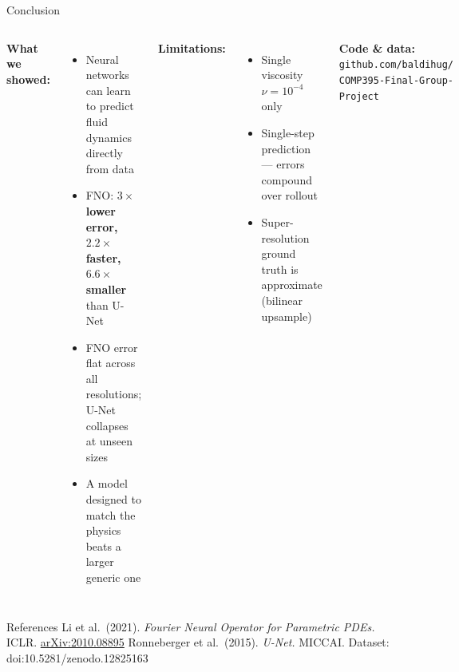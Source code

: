 \documentclass[aspectratio=169, 11pt]{beamer}
\begin{document}
\begin{frame}{Conclusion}
  \begin{columns}[t]
      \textbf{What we showed:}
      \begin{itemize}
        \item Neural networks can learn to predict fluid dynamics directly from data
        \item FNO: \textbf{$3\times$ lower error, $2.2\times$ faster, $6.6\times$ smaller} than U-Net
        \item FNO error flat across all resolutions; U-Net collapses at unseen sizes
        \item A model designed to match the physics beats a larger generic one
      \end{itemize}
      \textbf{Limitations:}
      \begin{itemize}
        \item Single viscosity $\nu=10^{-4}$ only
        \item Single-step prediction --- errors compound over rollout
        \item Super-resolution ground truth is approximate (bilinear upsample)
      \end{itemize}
      \vspace{0.4em}
      \textbf{Code \& data:}\\
      {\footnotesize\texttt{github.com/baldihug/\\COMP395-Final-Group-Project}}
  \end{columns}
  \vspace{0.4em}
  \begin{block}{References}
    \footnotesize
    Li et al.\ (2021). \textit{Fourier Neural Operator for Parametric PDEs.} ICLR.
    \href{https://arxiv.org/abs/2010.08895}{arXiv:2010.08895} \quad
    Ronneberger et al.\ (2015). \textit{U-Net.} MICCAI. \quad
    Dataset: doi:10.5281/zenodo.12825163
  \end{block}
\end{frame}
\end{document}
